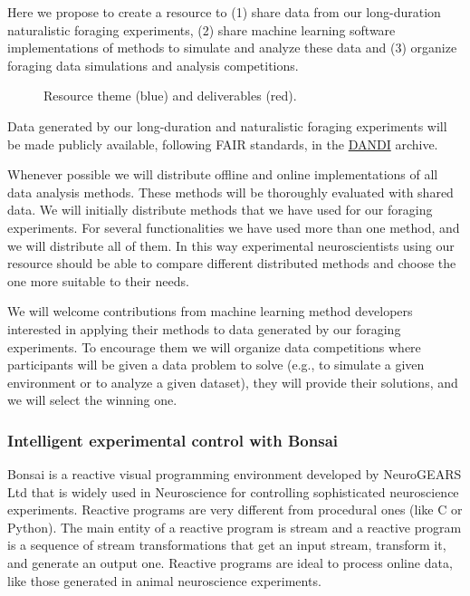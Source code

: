Here we propose to create a resource to (1) share data from our long-duration
naturalistic foraging experiments, (2) share machine learning software
implementations of methods to simulate and analyze these data and (3) organize
foraging data simulations and analysis competitions.

\begin{figure}
    \begin{center}
        
    \end{center}
    \caption{Resource theme (blue) and deliverables (red).}
    \label{fig:resource}
\end{figure}

Data generated by our long-duration and naturalistic foraging experiments will
be made publicly available, following FAIR standards, in the
\href{https://dandiarchive.org/}{DANDI} archive.

Whenever possible we will distribute offline and online implementations of all
data analysis methods. These methods will be thoroughly evaluated with shared
data.
%
We will initially distribute methods that we have used for our foraging
experiments. For several functionalities we have used more than one method, and
we will distribute all of them. In this way experimental neuroscientists using
our resource should be able to compare different distributed methods and choose
the one more suitable to their needs.

We will welcome contributions from machine learning method developers
interested in applying their methods to data generated by our foraging
experiments. To encourage them we will organize data
competitions where participants will be given a data problem to solve (e.g., to
simulate a given environment or to analyze a given dataset), they will provide
their solutions, and we will select the winning one.

\subsubsection*{Intelligent experimental control with Bonsai}

Bonsai is a reactive visual programming environment developed by NeuroGEARS Ltd
that is widely used in Neuroscience for controlling sophisticated neuroscience
experiments. Reactive programs are very different from procedural ones (like C
or Python). The main entity of a reactive program is stream and a reactive
program is a sequence of stream transformations that get an input stream,
transform it, and generate an output one. Reactive programs are ideal to
process online data, like those generated in animal neuroscience experiments.

